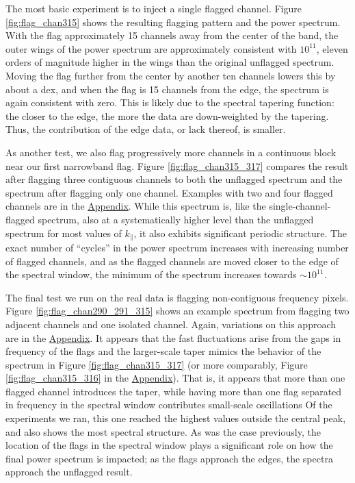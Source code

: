 \documentclass[12pt]{article}
\begin{document}
The most basic experiment is to inject a single flagged channel. Figure \ref{fig:flag_chan315} shows the resulting flagging pattern and the power spectrum. With the flag approximately 15 channels away from the center of the band, the outer wings of the power spectrum are approximately consistent with $10^{11}$, eleven orders of magnitude higher in the wings than the original unflagged spectrum. Moving the flag further from the center by another ten channels lowers this by about a dex, and when the flag is 15 channels from the edge, the spectrum is again consistent with zero. This is likely due to the spectral tapering function: the closer to the edge, the more the data are down-weighted by the tapering. Thus, the contribution of the edge data, or lack thereof, is smaller.

As another test, we also flag progressively more channels in a continuous block near our first narrowband flag. Figure \ref{fig:flag_chan315_317} compares the result after flagging three contiguous channels to both the unflagged spectrum and the spectrum after flagging only one channel. Examples with two and four flagged channels are in the \hyperlink{appendix}{Appendix}. While this spectrum is, like the single-channel-flagged spectrum, also at a systematically higher level than the unflagged spectrum for most values of $k_\parallel$, it also exhibits significant periodic structure. The exact number of ``cycles'' in the power spectrum increases with increasing number of flagged channels, and as the flagged channels are moved closer to the edge of the spectral window, the minimum of the spectrum increases towards $\sim 10^{11}$.

The final test we run on the real data is flagging non-contiguous frequency pixels. Figure \ref{fig:flag_chan290_291_315} shows an example spectrum from flagging two adjacent channels and one isolated channel. Again, variations on this approach are in the \hyperlink{appendix}{Appendix}. It appears that the fast fluctuations arise from the gaps in frequency of the flags and the larger-scale taper mimics the behavior of the spectrum in Figure \ref{fig:flag_chan315_317} (or more comparably, Figure \ref{fig:flag_chan315_316} in the \hyperlink{appendix}{Appendix}). That is, it appears that more than one flagged channel introduces the taper, while having more than one flag separated in frequency in the spectral window contributes small-scale oscillations Of the experiments we ran, this one reached the highest values outside the central peak, and also shows the most spectral structure. As was the case previously, the location of the flags in the spectral window plays a significant role on how the final power spectrum is impacted; as the flags approach the edges, the spectra approach the unflagged result. \vspace{3mm}
\end{document}
